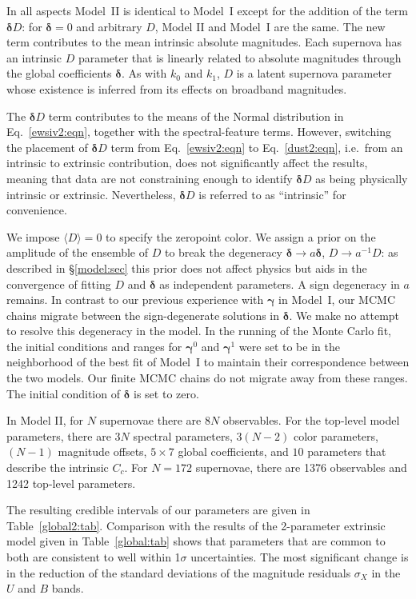 \documentclass{aastex61}   	%
\begin{document}
In all aspects Model~II is identical to Model~I except for the addition of the term $\pmb{\delta} D$: for $\pmb{\delta}=0$ and arbitrary $D$, Model II
and Model~I are the same.
The new term contributes to the mean intrinsic
absolute magnitudes. 
Each supernova has an intrinsic $D$ parameter that is linearly related to
absolute magnitudes through the global coefficients $\pmb{\delta}$.  As with $k_0$ and $k_1$,  $D$ is a latent supernova parameter whose existence is inferred from
its effects on broadband magnitudes.


The $\pmb{\delta} D$ term contributes to the means of the Normal distribution in Eq.~\ref{ewsiv2:eqn}, together with the spectral-feature terms.
However, switching the placement of 
$\pmb{\delta} D$ term from Eq.~\ref{ewsiv2:eqn} to Eq.~\ref{dust2:eqn}, i.e.\ from an intrinsic to extrinsic contribution,
does not significantly affect the results, meaning that data are not constraining enough
to identify $\pmb{\delta} D$ as being physically intrinsic or extrinsic.  Nevertheless, $\pmb{\delta} D$ is referred to as ``intrinsic''  for convenience.

We impose
$\langle D\rangle=0$
to specify the zeropoint color.  We assign a prior on the amplitude of the ensemble of $D$ to break the
degeneracy $\pmb{\delta} \rightarrow a\pmb{\delta}$, $D \rightarrow a^{-1}D$: as described
in \S\ref{model:sec} this prior does not affect physics but aids in the convergence of fitting $D$ and $\pmb{\delta}$ as independent parameters.
A sign degeneracy in $a$ remains.
In contrast to our previous experience with $\pmb{\gamma}$ in Model~I, our MCMC chains migrate between
the sign-degenerate solutions in  $\pmb{\delta}$.  We make
no attempt to resolve this degeneracy in the model.
In the running of the Monte Carlo fit, the initial conditions and ranges for
$\pmb{\gamma}^0$ and $\pmb{\gamma}^1$ were set to be in the neighborhood of the best fit of Model~I
to maintain their correspondence between the two models.
Our finite MCMC chains do not migrate away from these ranges.
The initial condition of $\pmb{\delta}$ is set to zero.

In Model II, for $N$ supernovae there are $8N$ observables.  For the top-level model parameters, there are $3N$ spectral parameters, $3(N-2)$
color parameters, $(N-1)$ magnitude offsets,  $5 \times 7$ global coefficients, and $10$ parameters that describe the intrinsic
$C_c$.  For $N=172$ supernovae, there are 1376 observables and 1242 top-level parameters.

The resulting credible intervals of our parameters are given in Table~\ref{global2:tab}.  Comparison with the
results of the 2-parameter extrinsic model given in Table~\ref{global:tab} shows that  parameters that are common to both
are consistent  to well within 1$\sigma$ uncertainties.  The most significant change is in the reduction of the standard
deviations of the magnitude residuals $\sigma_X$
in the $U$ and $B$ bands.
\end{document}

